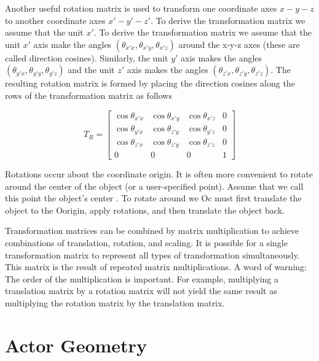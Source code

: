 Another useful rotation matrix is used to transform one coordinate axes $x-y-z$ to another coordinate axes $x'-y'-z'$. To derive the transformation matrix we assume that the unit $x'$. To derive the transformation matrix we assume that the unit $x'$ axis make the angles $(\theta_{x'x},\theta_{x'y},\theta_{x'z})$ around the x-y-z axes (these are called direction cosines). Similarly, the unit $y'$ axis makes the angles $(\theta_{y'x},\theta_{y'y},\theta_{y'z})$ and the unit $z'$ axis makes the angles $(\theta_{z'x},\theta_{z'y},\theta_{z'z})$. The resulting rotation matrix is formed by placing the direction cosines along the rows of the transformation matrix as follows

\begin{equation}\label{eq:3.13}
T_R = \left[\begin{array}{cccc}
\cos\theta_{x'x} & \cos\theta_{x'y} & \cos\theta_{x'z} & 0 \\
\cos\theta_{y'x} & \cos\theta_{z'y} & \cos\theta_{y'z} & 0 \\
\cos\theta_{z'x} & \cos\theta_{z'y} & \cos\theta_{z'z} & 0 \\
0 & 0 & 0 & 1
\end{array}\right]
\end{equation}


Rotations occur about the coordinate origin. It is often more convenient to rotate around the center of the object (or a user-specified point). Assume that we call this point the object's center . To rotate around we Oc must first translate the object to the Oorigin, apply rotations, and then translate the object back.

Transformation matrices can be combined by matrix multiplication to achieve combinations of translation, rotation, and scaling. It is possible for a single transformation matrix to represent all types of transformation simultaneously. This matrix is the result of repeated matrix multiplications. A word of warning: The order of the multiplication is important. For example, multiplying a translation matrix by a rotation matrix will not yield the same result as multiplying the rotation matrix by the translation matrix.

\section{Actor Geometry}

